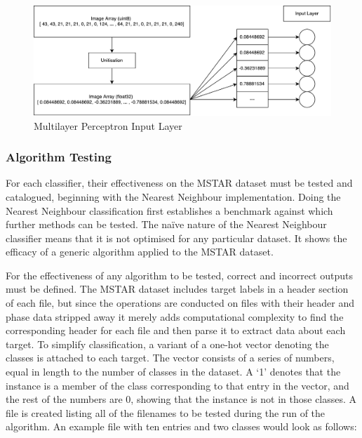 \begin{figure}[!h]
	
	\centering
	\includegraphics[width=\textwidth]{figures/multilayer_perceptron_input}
	\centering
	\caption{Multilayer Perceptron Input Layer}
	\label{fig:multi_input}
\end{figure}


\subsubsection{Algorithm Testing}
For each classifier, their effectiveness on the MSTAR dataset must be tested and catalogued, beginning with the Nearest Neighbour implementation. Doing the Nearest Neighbour classification first establishes a benchmark against which further methods can be tested. The na{\"i}ve nature of the Nearest Neighbour classifier means that it is not optimised for any particular dataset. It shows the efficacy of a generic algorithm applied to the MSTAR dataset.

For the effectiveness of any algorithm to be tested, correct and incorrect outputs must be defined. The MSTAR dataset includes target labels in a header section of each file, but since the operations are conducted on files with their header and phase data stripped away it merely adds computational complexity to find the corresponding header for each file and then parse it to extract data about each target. 
To simplify classification, a variant of a one-hot vector denoting the classes is attached to each target. The vector consists of a series of numbers, equal in length to the number of classes in the dataset. A `1' denotes that the instance is a member of the class corresponding to that entry in the vector, and the rest of the numbers are 0, showing that the instance is not in those classes. A file is created listing all of the filenames to be tested during the run of the algorithm. An example file with ten entries and two classes would look as follows:\\

